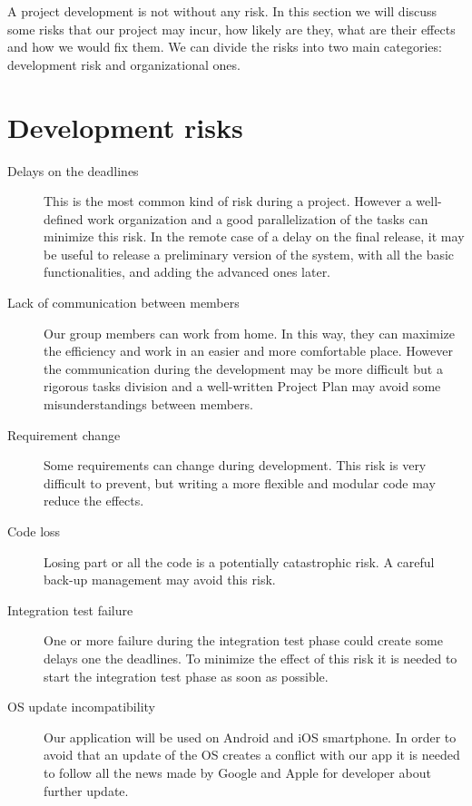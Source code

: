 A project development is not without any risk. In this section we will discuss some risks that our project may incur, how likely are they, what are their effects and how we would fix them. We can divide the risks into two main categories: development risk and organizational ones.
\section{Development risks}
\begin{description}
\item[Delays on the deadlines] This is the most common kind of risk during a project. However a well-defined work organization and a good parallelization of the tasks can minimize this risk. In the remote case of a delay on the final release, it may be useful to release a preliminary version of the system, with all the basic functionalities, and adding the advanced ones later.
\item[Lack of communication between members] Our group members can work from home. In this way, they can maximize the efficiency and work in an easier and more comfortable place. However the communication during the development may be more difficult but a rigorous tasks division and a well-written Project Plan may avoid some misunderstandings between members.
\item[Requirement change] Some requirements can change during development. This risk is very difficult to prevent, but writing a more flexible and modular code may reduce the effects.
\item[Code loss] Losing part or all the code is a potentially catastrophic risk. A careful back-up management may avoid this risk.
\item[Integration test failure] One or more failure during the integration test phase could create some delays one the deadlines. To minimize the effect of this risk it is needed to start the integration test phase as soon as possible.
\item[OS update incompatibility] Our application will be used on Android and iOS smartphone. In order to avoid that an update of the OS creates a conflict with our app it is needed to follow all the news made by Google and Apple for developer about further update.
\end{description}

